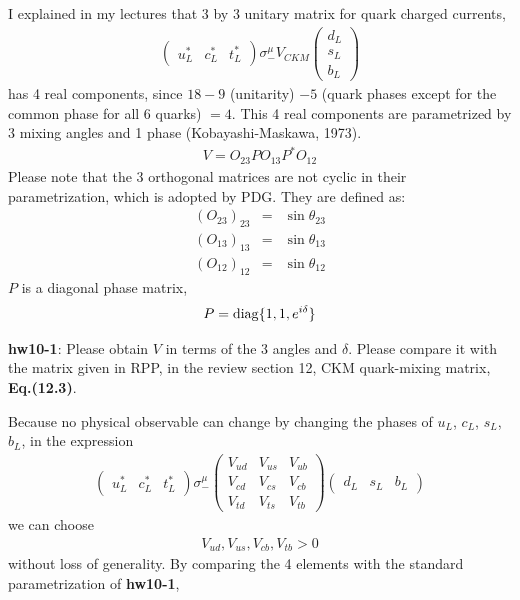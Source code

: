 \documentclass[12pt]{article}
\begin{document}
  I explained in my lectures that 3 by 3 unitary matrix for quark
  charged currents,
  \begin{eqnarray}
    \begin{pmatrix}
      u_L^* & c_L^* & t_L^*
    \end{pmatrix}
    \sigma_-^\mu V_{CKM}
    \begin{pmatrix}
      d_L \\ s_L \\ b_L
    \end{pmatrix}
  \end{eqnarray}
   has 4 real components, since $18-9$ (unitarity) $-5$ (quark phases except for
  the common phase for all $6$ quarks) $= 4$.  This 4 real components are
  parametrized by 3 mixing angles and 1 phase (Kobayashi-Maskawa, 1973).
  \begin{eqnarray}
    V = O_{23} P O_{13} P^* O_{12}
  \end{eqnarray}
  Please note that the 3 orthogonal matrices are not cyclic in their
  parametrization, which is adopted by PDG.  They are defined as:
\begin{eqnarray}
  (O_{23})_{23}&=&\sin\theta_{23} \\
  (O_{13})_{13}&=&\sin\theta_{13} \\
  (O_{12})_{12}&=&\sin\theta_{12} 
\end{eqnarray}
  $P$ is a diagonal phase matrix,
\begin{eqnarray}
  P = {\rm diag}\{ 1, 1, e^{i\delta} \}
\end{eqnarray}

{\bf hw10-1}: Please obtain $V$ in terms of the 3 angles and $\delta$.
  Please compare it with the matrix given in RPP, in
  the review section 12, CKM quark-mixing matrix, {\bf Eq.(12.3)}.

  Because no physical observable can change by changing the
  phases of $u_L$, $c_L$, $s_L$, $b_L$, in the expression
\begin{eqnarray}
  \begin{pmatrix}
    u_L^* & c_L^* & t_L^*
  \end{pmatrix}
  \sigma_-^\mu
  \begin{pmatrix}
    V_{ud} & V_{us} & V_{ub} \\
    V_{cd} & V_{cs} & V_{cb} \\
    V_{td} & V_{ts} & V_{tb}
  \end{pmatrix}
  \begin{pmatrix}
    d_L & s_L & b_L 
  \end{pmatrix}
\end{eqnarray}
  we can choose
  \begin{eqnarray}
    V_{ud}, V_{us}, V_{cb}, V_{tb} > 0
  \end{eqnarray}
  without loss of generality. By comparing the 4 elements with the
  standard parametrization of {\bf hw10-1},
\end{document}
